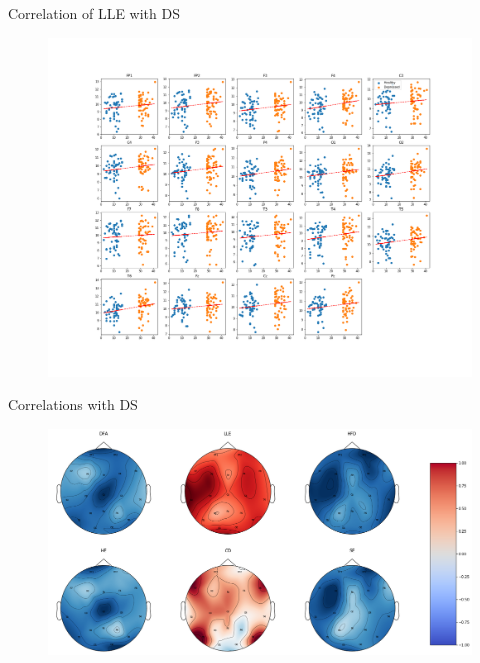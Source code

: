 \documentclass{beamer}
\begin{document}

\begin{frame}[noframenumbering]{Correlation of LLE with DS}
  \centering
  \begin{figure}[tbp]
    \centering
    \includegraphics[width=\linewidth]{../Images/dists/lyapdepcorr.png}
  \end{figure}
\end{frame}


\begin{frame}[noframenumbering]{Correlations with DS}
  \centering
  \begin{figure}[tbp]
    \centering
    \includegraphics[width=\linewidth]{../Images/scalp_corr.png}
  \end{figure}
\end{frame}
\end{document}
